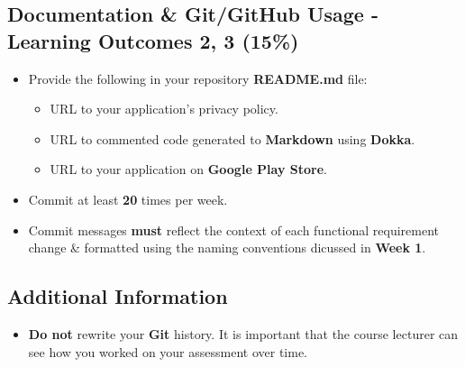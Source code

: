 \documentclass{article}
\begin{document}
\subsection*{Documentation \& Git/GitHub Usage - Learning Outcomes 2, 3 (15\%)}
\begin{itemize}
	\item Provide the following in your repository \textbf{README.md} file:
	      \begin{itemize}
		      \item URL to your application's privacy policy.
		      \item URL to commented code generated to \textbf{Markdown} using \textbf{Dokka}.
		      \item URL to your application on \textbf{Google Play Store}.
	      \end{itemize}
    \item Commit at least \textbf{20} times per week.
    \item Commit messages \textbf{must} reflect the context of each functional requirement change \& formatted using the naming conventions dicussed in \textbf{Week 1}. 
\end{itemize}

\subsection*{Additional Information}
\begin{itemize}
	\item \textbf{Do not} rewrite your \textbf{Git} history. It is important that the course lecturer can see how you worked on your assessment over time.
\end{itemize}
\end{document}
